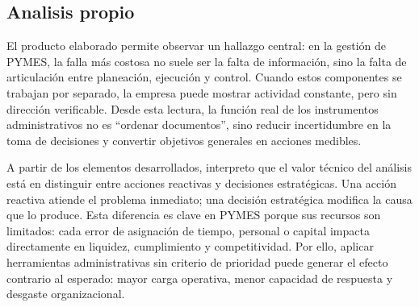 \documentclass[
	spanish,
	letterpaper, oneside
]{article}
\begin{document}
%

\subsection{Analisis propio}

El producto elaborado permite observar un hallazgo central: en la gestión de PYMES, la falla más costosa no suele ser la falta de información, sino la falta de articulación entre planeación, ejecución y control. Cuando estos componentes se trabajan por separado, la empresa puede mostrar actividad constante, pero sin dirección verificable. Desde esta lectura, la función real de los instrumentos administrativos no es “ordenar documentos”, sino reducir incertidumbre en la toma de decisiones y convertir objetivos generales en acciones medibles.

A partir de los elementos desarrollados, interpreto que el valor técnico del análisis está en distinguir entre acciones reactivas y decisiones estratégicas. Una acción reactiva atiende el problema inmediato; una decisión estratégica modifica la causa que lo produce. Esta diferencia es clave en PYMES porque sus recursos son limitados: cada error de asignación de tiempo, personal o capital impacta directamente en liquidez, cumplimiento y competitividad. Por ello, aplicar herramientas administrativas sin criterio de prioridad puede generar el efecto contrario al esperado: mayor carga operativa, menor capacidad de respuesta y desgaste organizacional.
\end{document}
